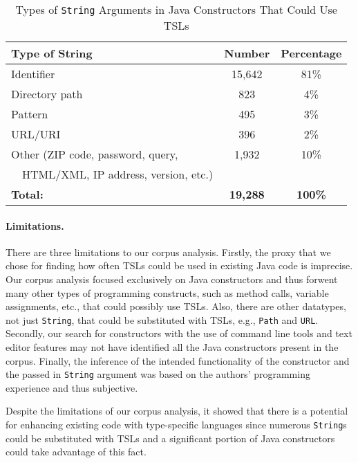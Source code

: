 \begin{table}
   \centering
    \begin{tabular}[t]{l | c | c}
    \bf Type of String & \bf Number & \bf Percentage \\ \hline
    Identifier & 15,642 & 81\% \\
    Directory path& 823 & 4\% \\
    Pattern & 495 & 3\% \\
    URL/URI & 396 & 2\% \\
    Other (ZIP code, password, query, & 1,932 & 10\% \\
    ~~HTML/XML, IP address, version, etc.)  & & \\ \hline
    \bf Total: & \bf 19,288 & \bf 100\%
    \end{tabular}
    \vspace{0.15in}
    \caption{Types of \lstinline{String} Arguments in Java Constructors That Could Use TSLs}
    \label{strings-in-constructors}
\end{table}

\paragraph{Limitations.} There are three limitations to our corpus analysis. Firstly, the proxy that we chose for finding how often TSLs could be used in existing Java code is imprecise. Our corpus analysis focused exclusively on Java constructors and thus forwent many other types of programming constructs, such as method calls, variable assignments, etc., that could possibly use TSLs. Also, there are other datatypes, not just \lstinline{String}, that could be substituted with TSLs, e.g., \lstinline{Path} and \lstinline{URL}. Secondly, our search for constructors with the use of command line tools and text editor features may not have identified all the Java constructors present in the corpus. Finally, the inference of the intended functionality of the constructor and the passed in \lstinline{String} argument was based on the authors' programming experience and thus subjective.

\vspace{10px}

Despite the limitations of our corpus analysis, it showed that there is a potential for enhancing existing code with type-specific languages since numerous \lstinline{String}s could be substituted with TSLs and a significant portion of Java constructors could take advantage of this fact.

